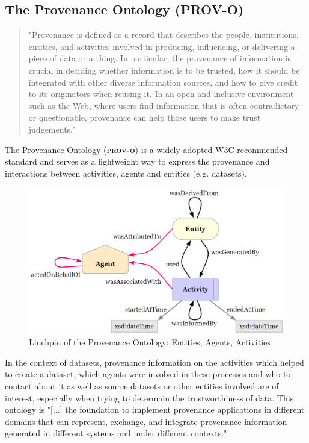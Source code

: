 \documentclass[a4paper,english,twoside,BCOR1.5cm,headsepline,DIV12,appendixprefix,final,12pt]{scrbook}
\newcommand{\prov}{{\scshape\bfseries prov-o}\xspace}
\begin{document}
\subsection{The Provenance Ontology (PROV-O)}
\label{sec:prov}

\begin{quote}
"Provenance is defined as a record that describes the people, institutions, entities, and activities involved in producing, influencing, or delivering a piece of data or a thing. In particular, the provenance of information is crucial in deciding whether information is to be trusted, how it should be integrated with other diverse information sources, and how to give credit to its originators when reusing it. In an open and inclusive environment such as the Web, where users find information that is often contradictory or questionable, provenance can help those users to make trust judgements." \cite{MoreauProvDM2013}
\end{quote}


The Provenance Ontology\cite{prov} (\prov) is a widely adopted W3C recommended standard and serves as a lightweight way to express the provenance and interactions between activities, agents and entities (e.g. datasets). 

\begin{figure}[!htbp]
\centering
  \includegraphics[width=\textwidth]{images/ProvLinchpin.png}
  \caption{Linchpin of the Provenance Ontology: Entities, Agents, Activities \cite{prov}}
  \label{fig:prov}
\end{figure}

In the context of datasets, provenance information on the activities which helped to create a dataset, which agents were involved in these processes and who to contact about it as well as source datasets or other entities involved are of interest, especially when trying to determain the trustworthiness of data. This ontology is "[...] the foundation to implement provenance applications in different domains that can represent, exchange, and integrate provenance information generated in different systems and under different contexts." \cite{prov}
\end{document}
